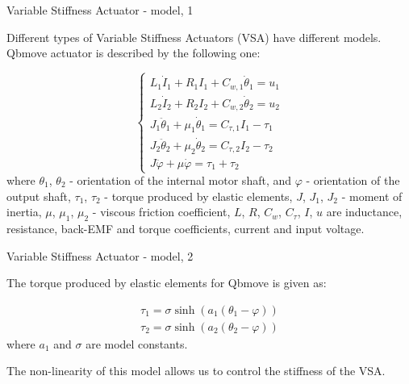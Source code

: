 \documentclass{beamer}
\begin{document}
\begin{frame}{Variable Stiffness Actuator - model, 1}
	\begin{flushleft}
		
		Different types of Variable Stiffness Actuators (VSA) have different models. Qbmove actuator is described by the following one:
		
	\begin{equation}
		\begin{cases}
			L_1 \dot I_1 + R_1 I_1 + C_{w,1} \dot \theta_1 = u_1 
			\\
			L_2 \dot I_2 + R_2 I_2 + C_{w,2} \dot \theta_2 = u_2
			 \\
			J_1 \ddot \theta_1 + \mu_1 \dot \theta_1 = C_{\tau, 1} I_1 - \tau_1
			 \\
			J_2 \ddot \theta_2 + \mu_2 \dot \theta_2 = C_{\tau, 2} I_2 - \tau_2 
			\\
			J \ddot \varphi + \mu \dot \varphi = \tau_1 + \tau_2
		\end{cases}
	\end{equation}
%
where $\theta_1$, $\theta_2$  - orientation of the internal motor shaft, and $\varphi$ - orientation of the output shaft, $\tau_1$, $\tau_2$ - torque produced by elastic elements, $J$, $J_1$, $J_2$ - moment of inertia, $\mu$, $\mu_1$, $\mu_2$ - viscous friction coefficient, 
$L$, $R$, $C_w$, $C_\tau$, $I$, $u$ are inductance, resistance, back-EMF and torque coefficients, current and input voltage.
		
		
	\end{flushleft}
\end{frame}






\begin{frame}{Variable Stiffness Actuator - model, 2}
	\begin{flushleft}
		
		The torque produced by elastic elements for Qbmove is given as:
		
		\begin{align}
			\tau_1 = \sigma \sinh (a_1 (\theta_1 - \varphi)) 
			\\
			\tau_2 = \sigma \sinh (a_2 (\theta_2 - \varphi)) 
		\end{align}
		where $a_1$ and $\sigma$ are model constants.
		
		\bigskip
		
		The non-linearity of this model allows us to control the stiffness of the VSA.
		
	\end{flushleft}
\end{frame}
\end{document}
